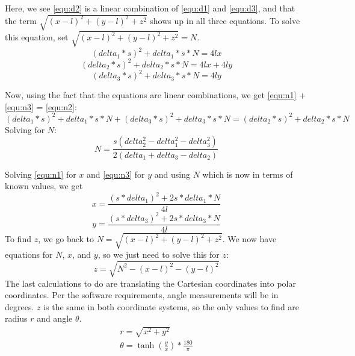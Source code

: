 \documentclass{article}
\begin{document}
Here, we see \eqref{equ:d2} is a linear combination of \eqref{equ:d1} and \eqref{equ:d3}, and that the term $\sqrt{(x-l)^2+(y-l)^2+z^2}$ shows up in all three equations. To solve this equation, set $\sqrt{(x-l)^2+(y-l)^2+z^2} = N$.
\begin{equation}
\label{equ:n1}
    (delta_1*s)^2  + delta_1*s*N= 4lx
\end{equation}
\begin{equation}
\label{equ:n2}
     (delta_2*s)^2 + delta_2*s*N = 4lx+4ly
\end{equation}
\begin{equation}
\label{equ:n3}
     (delta_3*s)^2 + delta_3*s*N = 4ly
\end{equation}

Now, using the fact that the equations are linear combinations, we get \eqref{equ:n1} + \eqref{equ:n3} = \eqref{equ:n2}:
\begin{equation*}
    (delta_1*s)^2  + delta_1*s*N + (delta_3*s)^2 + delta_3*s*N = (delta_2*s)^2 + delta_2*s*N
\end{equation*}
Solving for $N$:
\[N = \frac{s(delta_2^2-delta_1^2-delta_3^2)}{2(delta_1+delta_3-delta_2)}\]

Solving \eqref{equ:n1} for $x$ and \eqref{equ:n3} for $y$ and using $N$ which is now in terms of known values, we get
\begin{equation*}
    x = \frac{(s*delta_1)^2 + 2s*delta_1*N}{4l}
\end{equation*}
\begin{equation*}
    y = \frac{(s*delta_3)^2 + 2s*delta_3*N}{4l}
\end{equation*}
To find $z$, we go back to $N = \sqrt{(x-l)^2+(y-l)^2+z^2}$. We now have equations for $N$, $x$, and $y$, so we just need to solve this for $z$:
\[ z = \sqrt{N^2-(x-l)^2-(y-l)^2}\]
The last calculations to do are translating the Cartesian coordinates into polar coordinates. Per the software requirements, angle measurements will be in degrees. $z$ is the same in both coordinate systems, so the only values to find are radius $r$ and angle $\theta$. 
\begin{gather*}
    r = \sqrt{x^2+y^2}\\
    \theta = \tanh{(\frac{y}{x})}*\frac{180}{\pi}
\end{gather*}
\end{document}
